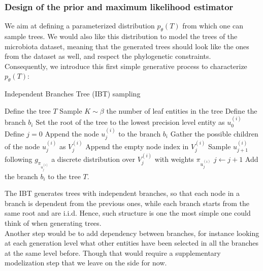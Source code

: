 \subsubsection{Design of the prior and maximum likelihood estimator}


We aim at defining a parameterized distribution $p_{\theta}(T)$ from which one can sample trees.
We would also like this distribution to model the trees of the microbiota dataset, meaning that
the generated trees should look like the ones from the dataset as well, and respect the phylogenetic constraints. \\

Consequently, we introduce this first simple generative process to characterize $p_{\theta}(T)$:
\begin{algorithm}[H]
    \caption{Independent Branches Tree (IBT) sampling}
    \begin{algorithmic}
        \STATE Define the tree $T$
        \STATE Sample $K \sim \beta$ the number of leaf entities in the tree
            \STATE \quad Define the branch $b_i$
            \STATE \quad Set the root of the tree to the lowest precision level entity as $u_0^{(i)}$
            \STATE \quad Define $j = 0$
                \STATE \quad \quad Append the node $u_{j}^{(i)}$ to the branch $b_i$
                \STATE \quad \quad Gather the possible children of the node $u_{j}^{(i)}$ as $V_{j}^{(i)}$
                \STATE \quad \quad Append the empty node index in $V_{j}^{(i)}$
                \STATE \quad \quad Sample $u_{j+1}^{(i)}$ following $g_{\pi_{u_{j}^{(i)}}}$ a discrete distribution over $V_{j}^{(i)}$ with weights $\pi_{u_{j}^{(i)}}$
                \STATE \quad \quad $j \leftarrow j + 1$
            \EndWhile
            \STATE \quad Add the branch $b_i$ to the tree $T$.
        \EndFor
    \end{algorithmic}
    \label{alg:algorithm}
\end{algorithm}

The IBT generates trees with independent branches, so that each node in a branch is dependent from the previous ones,
while each branch starts from the same root and are i.i.d.
Hence, such structure is one the most simple one could think of when generating trees. \\
Another step would be to add dependency between branches, for instance looking at each generation level what other entities
have been selected in all the branches at the same level before.
Though that would require a supplementary modelization step that we leave on the side for now. \\

